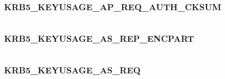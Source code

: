 \documentclass[letterpaper,10pt,english]{sphinxmanual}
\begin{document}
\subsubsection{KRB5\_KEYUSAGE\_AP\_REQ\_AUTH\_CKSUM}
\label{appdev/refs/macros/KRB5_KEYUSAGE_AP_REQ_AUTH_CKSUM:krb5-keyusage-ap-req-auth-cksum-data}\label{appdev/refs/macros/KRB5_KEYUSAGE_AP_REQ_AUTH_CKSUM:krb5-keyusage-ap-req-auth-cksum}\label{appdev/refs/macros/KRB5_KEYUSAGE_AP_REQ_AUTH_CKSUM::doc}

\begin{fulllineitems}
\label{appdev/refs/macros/KRB5_KEYUSAGE_AP_REQ_AUTH_CKSUM:KRB5_KEYUSAGE_AP_REQ_AUTH_CKSUM}
\end{fulllineitems}


\begin{tabulary}{\linewidth}{|L|L|}
\hline

 & 
\\\hline
\end{tabulary}



\subsubsection{KRB5\_KEYUSAGE\_AS\_REP\_ENCPART}
\label{appdev/refs/macros/KRB5_KEYUSAGE_AS_REP_ENCPART:krb5-keyusage-as-rep-encpart-data}\label{appdev/refs/macros/KRB5_KEYUSAGE_AS_REP_ENCPART::doc}\label{appdev/refs/macros/KRB5_KEYUSAGE_AS_REP_ENCPART:krb5-keyusage-as-rep-encpart}

\begin{fulllineitems}
\label{appdev/refs/macros/KRB5_KEYUSAGE_AS_REP_ENCPART:KRB5_KEYUSAGE_AS_REP_ENCPART}
\end{fulllineitems}


\begin{tabulary}{\linewidth}{|L|L|}
\hline

 & 
\\\hline
\end{tabulary}



\subsubsection{KRB5\_KEYUSAGE\_AS\_REQ}
\label{appdev/refs/macros/KRB5_KEYUSAGE_AS_REQ:krb5-keyusage-as-req-data}\label{appdev/refs/macros/KRB5_KEYUSAGE_AS_REQ:krb5-keyusage-as-req}\label{appdev/refs/macros/KRB5_KEYUSAGE_AS_REQ::doc}
\end{document}
